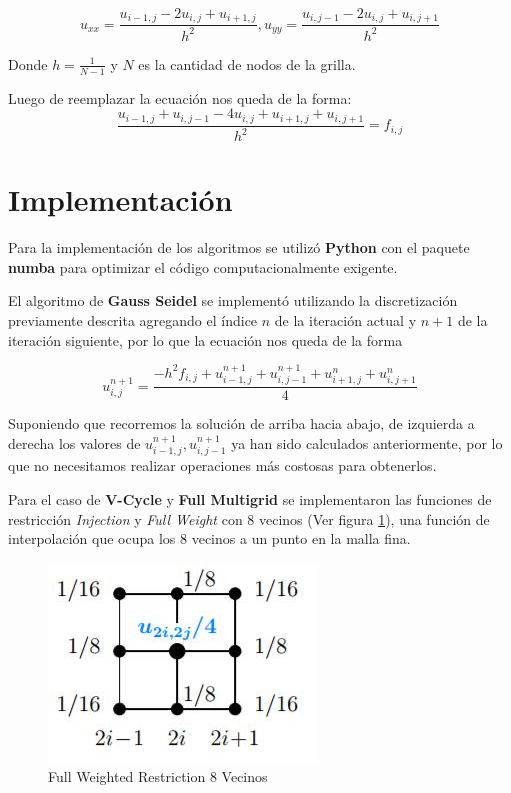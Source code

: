 \documentclass[letter, 10pt]{article}
\begin{document}
\begin{equation}
     u_{xx} = \frac{ u_{i-1,j} - 2  u_{i,j} + u_{i+1,j} }{h^2}  , u_{yy} = \frac{ u_{i,j-1} - 2 u_{i,j} + u_{i,j+1} }{h^2}
\end{equation}

Donde $h = \frac{1}{N-1}$ y $N$ es la cantidad de nodos de la grilla.

Luego de reemplazar la ecuación nos queda de la forma:
\begin{equation}
    \frac{ u_{i-1,j} + u_{i,j-1} - 4 u_{i,j} + u_{i+1,j} + u_{i,j+1} }{h^2} = f_{i,j} 
\end{equation}


\section{Implementación}
    Para la implementación de los algoritmos se utilizó \textbf{Python} con el paquete \textbf{numba} para optimizar el código computacionalmente exigente.
    
    El algoritmo de \textbf{Gauss Seidel} se implementó utilizando la discretización previamente descrita agregando el índice $n$ de la iteración actual y $n+1$ de la iteración siguiente, por lo que la ecuación nos queda de la forma
    
    \begin{equation}
     u_{i,j}^{n+1} = \frac{- h^2f_{i,j}+u_{i-1,j}^{n+1} + u_{i,j-1}^{n+1}+ u_{i+1,j}^{n} + u_{i,j+1}^{n} }{4} 
    \end{equation}
    
    Suponiendo que recorremos la solución de arriba hacia abajo, de izquierda a derecha los valores de $u_{i-1,j}^{n+1} , u_{i,j-1}^{n+1}$ ya han sido calculados anteriormente, por lo que no necesitamos realizar operaciones más costosas para obtenerlos.

    Para el caso de \textbf{V-Cycle} y \textbf{Full Multigrid} se implementaron las funciones de restricción \textit{Injection} y \textit{Full Weight} con 8 vecinos (Ver figura \ref{fig:fw}), una función de interpolación que ocupa los 8 vecinos a un punto en la malla fina.
    
    \begin{figure}
        \centering
        \includegraphics[scale=0.5]{fw.jpg}
        \caption{Full Weighted Restriction 8 Vecinos}
        \label{fig:fw}
    \end{figure}
    
\end{document}
